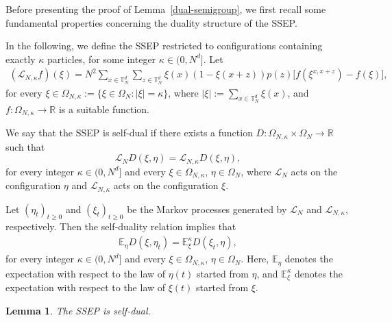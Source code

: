 \documentclass[UTF-8,reqno]{amsart}
\numberwithin{equation}{section}
\newtheorem{lemma}[theorem]{Lemma}
\def\geq{\geqslant}
\def\geq{\geqslant}
\begin{document}
Before presenting the proof of Lemma~\ref{dual-semigroup}, we first recall some fundamental properties concerning the duality structure of the SSEP.
 

In the following, we define the SSEP restricted to configurations containing exactly $\kappa$ particles, for some integer $\kappa \in (0, N^d]$. Let
\begin{align*}
	(\mathcal{L}_{N,\kappa} f)(\xi) = N^2 \sum_{x\in\mathbb{T}^d_N} \sum_{z\in\mathbb{T}^d_N} \xi(x)(1 - \xi(x+z))p(z)\big[f(\xi^{x,x+z}) - f(\xi)\big],
\end{align*}
for every $\xi \in \Omega_{N,\kappa} := \{ \xi \in \Omega_N : |\xi| = \kappa \}$, where $|\xi| := \sum_{x \in \mathbb{T}^d_N} \xi(x)$, and $f : \Omega_{N,\kappa} \rightarrow \mathbb{R}$ is a suitable function.

We say that the SSEP is self-dual if there exists a function $D : \Omega_{N,\kappa} \times \Omega_N \to \mathbb{R}$ such that
$$
\mathcal{L}_{N} D(\xi,\eta) = \mathcal{L}_{N,\kappa} D(\xi,\eta), 
$$
for every integer $\kappa \in (0, N^d]$ and every $\xi \in \Omega_{N,\kappa}$, $\eta \in \Omega_N$, where $\mathcal{L}_N$ acts on the configuration $\eta$ and $\mathcal{L}_{N,\kappa}$ acts on the configuration $\xi$.

Let $(\eta_t)_{t\geq 0}$ and $(\xi_t)_{t\geq 0}$ be the Markov processes generated by $\mathcal{L}_N$ and $\mathcal{L}_{N,\kappa}$, respectively. Then the self-duality relation implies that
\begin{align}\label{self-duality}
\mathbb{E}_{\eta} D(\xi, \eta_t) = \mathbb{E}^{\kappa}_{\xi} D(\xi_t, \eta),
\end{align}
for every integer $\kappa \in (0, N^d]$ and every $\xi \in \Omega_{N,\kappa}$, $\eta \in \Omega_N$. Here, $\mathbb{E}_{\eta}$ denotes the expectation with respect to the law of $\eta(t)$ started from $\eta$, and $\mathbb{E}^{\kappa}_{\xi}$ denotes the expectation with respect to the law of $\xi(t)$ started from $\xi$.





\begin{lemma}
The SSEP is self-dual.
\end{lemma}
\end{document}
